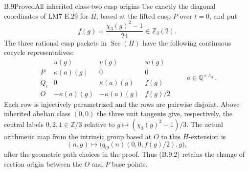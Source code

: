 \begin{statement}{B.9}{Proved}{All inherited class-two cusp origins}
Use exactly the diagonal coordinates of LM7 E.29 for $H$,
based at the lifted cusp $P$ over $t=0$, and put
\[
       f(g)=\frac{\chi_3(g)^2-1}{24}\in\mathbb Z_3(2).
                                                               \tag{B.9.1}
\]
The three rational cusp packets in $\operatorname{Sec}(H)$
have the following continuous cocycle representatives:
\[
 \begin{array}{c|ccc}
 &u(g)&v(g)&w(g)\\ \hline
 P&\kappa(a)(g)&0&0\\
 Q_c&0&\kappa(a)(g)&f(g)\\
 O&-\kappa(a)(g)&-\kappa(a)(g)&f(g)/2
 \end{array}
 \qquad a\in\mathbb Q^{\times\wedge_3}.                    \tag{B.9.2}
\]
Each row is injectively parametrized and the rows are
pairwise disjoint.  Above inherited abelian class $(0,0)$
the three unit tangents give, respectively, the central
labels $0,2,1\in\mathbb Z/3$ relative to
$g\mapsto(\chi_3(g)^2-1)/3$.
The actual arithmetic map from the intrinsic group based
at $O$ to this $H$-extension is
\[
 (n,g)\longmapsto
    \bigl(q_O(n)(0,0,f(g)/2),g\bigr),                       \tag{B.9.3}
\]
after the geometric path choices in the proof.
Thus (B.9.2) retains the change of section origin between
the $O$ and $P$ base points.
\end{statement}

